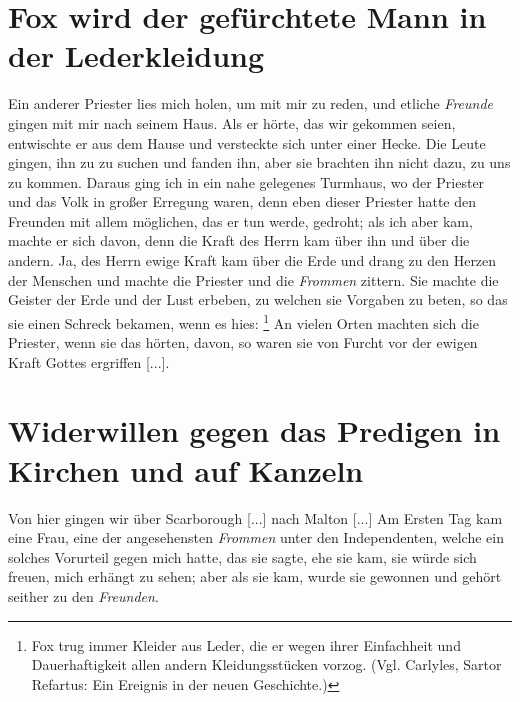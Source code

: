 \section{Fox wird der gefürchtete Mann in der Lederkleidung}

Ein anderer Priester lies mich holen, um mit mir zu reden,
und etliche \textit{Freunde} gingen mit mir nach seinem Haus. Als
er hörte, das wir gekommen seien, entwischte er aus dem Hause
und versteckte sich unter einer Hecke. Die Leute gingen, ihn zu
zu suchen und fanden ihn, aber sie brachten ihn nicht dazu, zu
uns zu kommen. Daraus ging ich in ein nahe gelegenes Turmhaus, 
wo der Priester und das Volk in großer Erregung waren,
denn eben dieser Priester hatte den Freunden mit allem möglichen,
das er tun werde, gedroht; als ich aber kam, machte er sich davon,
denn die Kraft des Herrn kam über ihn und über die andern.
Ja, des Herrn ewige Kraft kam über die Erde und drang zu
den Herzen der Menschen und machte die Priester und die
\textit{Frommen} zittern. Sie machte die 
Geister der Erde und der
Lust erbeben, zu welchen sie Vorgaben zu beten, so das sie einen
Schreck bekamen, wenn es hies: \footnote{Fox trug 
immer Kleider aus Leder, die er wegen ihrer Einfachheit und
Dauerhaftigkeit allen andern Kleidungsstücken vorzog. 
(Vgl. Carlyles, Sartor Refartus: Ein Ereignis in der 
neuen Geschichte.)} An vielen Orten machten sich die Priester,
wenn sie das hörten, davon, so waren sie von Furcht vor der
ewigen Kraft Gottes ergriffen [...].

\section{Widerwillen gegen das Predigen in Kirchen und auf Kanzeln}

Von hier gingen wir über Scarborough 
[...] nach Malton [...]
Am Ersten Tag kam eine Frau, eine der angesehensten \textit{Frommen}
unter den Independenten, welche ein 
solches Vorurteil gegen mich
hatte, das sie sagte, ehe sie kam, sie würde sich freuen, mich 
erhängt zu sehen; aber als sie kam, wurde sie gewonnen und 
gehört seither zu den \textit{Freunden}.


